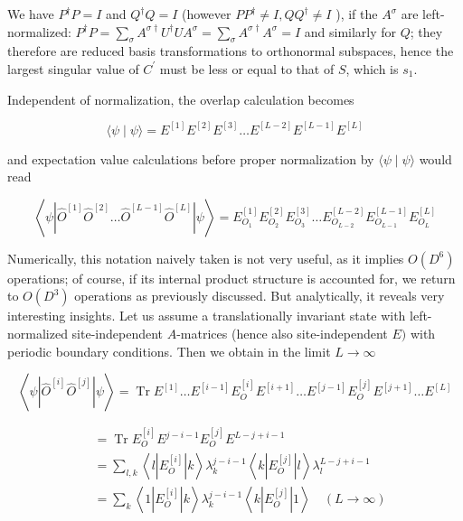 \documentclass[12pt]{article}
\begin{document}
We have $P^{\dagger} P=I$ and $Q^{\dagger} Q=I$ (however $P P^{\dagger} \neq I, Q Q^{\dagger} \neq I$ ), if the $A^{\sigma}$ are left-normalized: $P^{\dagger} P=\sum_{\sigma} A^{\sigma \dagger} U^{\dagger} U A^{\sigma}=\sum_{\sigma} A^{\sigma \dagger} A^{\sigma}=I$ and similarly for $Q$; they therefore are reduced basis transformations to orthonormal subspaces, hence the largest singular value of $C^{\prime}$ must be less or equal to that of $S$, which is $s_{1}$.

Independent of normalization, the overlap calculation becomes


\begin{equation*}
\langle\psi \mid \psi\rangle=E^{[1]} E^{[2]} E^{[3]} \ldots E^{[L-2]} E^{[L-1]} E^{[L]} \tag{113}
\end{equation*}


and expectation value calculations before proper normalization by $\langle\psi \mid \psi\rangle$ would read


\begin{equation*}
\left\langle\psi\left|\hat{O}^{[1]} \hat{O}^{[2]} \ldots \hat{O}^{[L-1]} \hat{O}^{[L]}\right| \psi\right\rangle=E_{O_{1}}^{[1]} E_{O_{2}}^{[2]} E_{O_{3}}^{[3]} \ldots E_{O_{L-2}}^{[L-2]} E_{O_{L-1}}^{[L-1]} E_{O_{L}}^{[L]} \tag{114}
\end{equation*}


Numerically, this notation naively taken is not very useful, as it implies $O\left(D^{6}\right)$ operations; of course, if its internal product structure is accounted for, we return to $O\left(D^{3}\right)$ operations as previously discussed. But analytically, it reveals very interesting insights. Let us assume a translationally invariant state with left-normalized site-independent $A$-matrices (hence also site-independent $E)$ with periodic boundary conditions. Then we obtain in the limit $L \rightarrow \infty$

$$
\left\langle\psi\left|\hat{O}^{[i]} \hat{O}^{[j]}\right| \psi\right\rangle=\operatorname{Tr} E^{[1]} \ldots E^{[i-1]} E_{O}^{[i]} E^{[i+1]} \ldots E^{[j-1]} E_{O}^{[j]} E^{[j+1]} \ldots E^{[L]}
$$

$$
\begin{aligned}
& =\operatorname{Tr} E_{O}^{[i]} E^{j-i-1} E_{O}^{[j]} E^{L-j+i-1} \\
& =\sum_{l, k}\left\langle l\left|E_{O}^{[i]}\right| k\right\rangle \lambda_{k}^{j-i-1}\left\langle k\left|E_{O}^{[j]}\right| l\right\rangle \lambda_{l}^{L-j+i-1} \\
& =\sum_{k}\left\langle 1\left|E_{O}^{[i]}\right| k\right\rangle \lambda_{k}^{j-i-1}\left\langle k\left|E_{O}^{[j]}\right| 1\right\rangle \quad(L \rightarrow \infty)
\end{aligned}
$$
\end{document}
